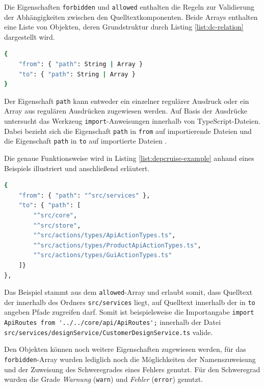 Die Eigenschaften \lstinline|forbidden| und \lstinline|allowed| enthalten die Regeln zur Validierung der Abhängigkeiten zwischen den Quelltextkomponenten. 
Beide Arrays enthalten eine Liste von Objekten, deren Grundstruktur durch Listing \ref{list:dc-relation} dargestellt wird.

\begin{lstlisting}[language=sh, label=list:dc-relation, caption=Struktur der Objekte für die Arrays \lstinline|forbidden| und \lstinline|allowed|]
{
    "from": { "path": String | Array }
    "to": { "path": String | Array }
}
\end{lstlisting}
Der Eigenschaft \lstinline|path| kann entweder ein einzelner regulärer Ausdruck oder ein Array aus regulären Ausdrücken zugewiesen werden. 
Auf Basis der Ausdrücke untersucht das Werkzeug \lstinline|import|-Anweisungen innerhalb von TypeScript-Dateien. Dabei bezieht sich die Eigenschaft \lstinline|path| in \lstinline|from| auf importierende Dateien und die Eigenschaft \lstinline|path| in \lstinline|to| auf importierte Dateien \autocite[vgl.][]{Verweij:Rules}.

Die genaue Funktionsweise wird in Listing \ref{list:depcruise-example} anhand eines Beispiels illustriert und anschließend erläutert.
\begin{lstlisting}[language={sh}, label=list:depcruise-example, caption=Beispiel einer Abhängigkeitesrelation]
{
    "from": { "path": "^src/services" },
    "to": { "path": [
        "^src/core",
        "^src/store",
        "^src/actions/types/ApiActionTypes.ts",
        "^src/actions/types/ProductApiActionTypes.ts",
        "^src/actions/types/GuiActionTypes.ts"
    ]}
},
\end{lstlisting}
Das Beispiel stammt aus dem \lstinline|allowed|-Array und erlaubt somit, dass Quelltext der innerhalb des Ordners \lstinline|src/services| liegt, auf Quelltext innerhalb der in \lstinline|to| angeben Pfade zugreifen darf. 
Somit ist beispielsweise die Importangabe \newline  
\glqq\lstinline|import ApiRoutes from '../../core/api/ApiRoutes';|\grqq \newline
innerhalb der Datei \lstinline|src/services/designService/CustomerDesignService.ts| valide.

Den Objekten können noch weitere Eigenschaften zugewiesen werden, für das \lstinline|forbidden|-Array wurden lediglich noch die Möglichkeiten der Namenszuweisung und der Zuweisung des Schweregrades eines Fehlers genutzt. Für den Schweregrad wurden die Grade \emph{Warnung} (\lstinline|warn|) und \emph{Fehler} (\lstinline|error|) genutzt.


